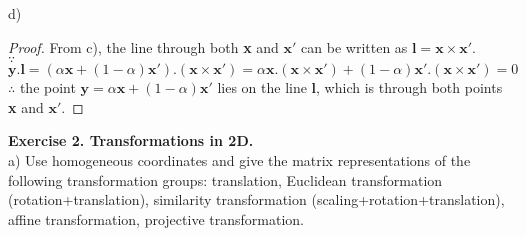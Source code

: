 \documentclass[letterpaper, 11pt]{article}
\begin{document}
d)
\begin{proof}
    From c), the line through both \textbf{x} and $\textbf{x}'$ can be written as $\textbf{l}=\textbf{x}\times\textbf{x}'$.\\
    $\because$ $\textbf{y}.\textbf{l} = (\alpha\textbf{x}+(1-\alpha)\textbf{x}').(\textbf{x}\times\textbf{x}')=\alpha\textbf{x}.(\textbf{x}\times\textbf{x}')+(1-\alpha)\textbf{x}'.(\textbf{x}\times\textbf{x}')=0$\\
    $\therefore$ the point $\textbf{y}=\alpha\textbf{x}+(1-\alpha)\textbf{x}'$ lies on the line \textbf{l}, which is through both points \textbf{x} and $\textbf{x}'$.

\end{proof}

\textbf{Exercise 2. Transformations in 2D.}\\
a) Use homogeneous coordinates and give the matrix representations of the following
transformation groups: translation, Euclidean transformation (rotation+translation),
similarity transformation (scaling+rotation+translation), affine transformation, projective transformation.\\
\end{document}
